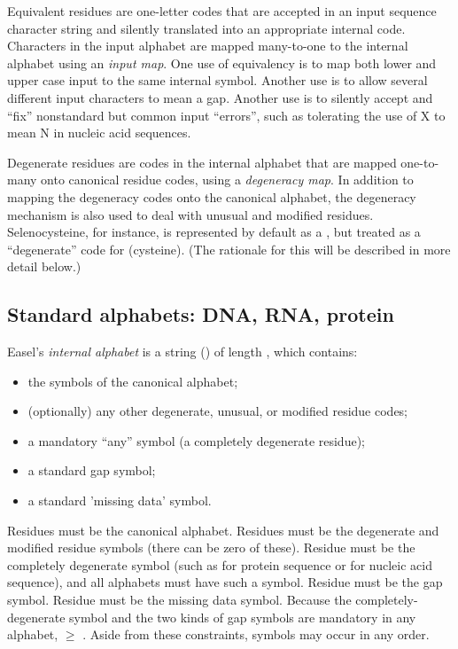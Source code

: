 Equivalent residues are one-letter codes that are accepted in an input
sequence character string and silently translated into an appropriate
internal code. Characters in the input alphabet are mapped many-to-one
to the internal alphabet using an \emph{input map}. One use of
equivalency is to map both lower and upper case input to the same
internal symbol. Another use is to allow several different input
characters to mean a gap. Another use is to silently accept and
``fix'' nonstandard but common input ``errors'', such as tolerating
the use of X to mean N in nucleic acid sequences.

Degenerate residues are codes in the internal alphabet that are mapped
one-to-many onto canonical residue codes, using a \emph{degeneracy
map}. In addition to mapping the degeneracy codes onto the canonical
alphabet, the degeneracy mechanism is also used to deal with unusual
and modified residues. Selenocysteine, for instance, is represented by
default as a , but treated as a ``degenerate'' code for
 (cysteine). (The rationale for this will be described in
more detail below.)


\subsection{Standard alphabets: DNA, RNA, protein}

Easel's \emph{internal alphabet} is a string () of
length , which contains:

\begin{itemize}
 \item the  symbols of the canonical alphabet;
 \item (optionally) any other degenerate, unusual, or modified residue codes;
 \item a mandatory ``any'' symbol (a completely degenerate residue);
 \item a standard gap symbol;
 \item a standard 'missing data' symbol.
\end{itemize}

Residues  must be the canonical alphabet. Residues
 must be the degenerate and modified residue symbols
(there can be zero of these). Residue  must be the
completely degenerate symbol (such as  for protein sequence
or  for nucleic acid sequence), and all alphabets must have
such a symbol. Residue  must be the gap symbol. Residue
 must be the missing data symbol.  Because the
completely-degenerate symbol and the two kinds of gap symbols are
mandatory in any alphabet,  $\geq$ . Aside from
these constraints, symbols may occur in any order.

